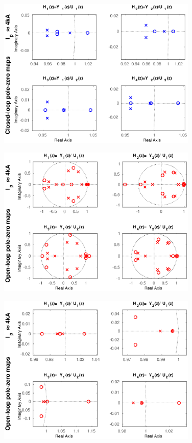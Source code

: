 \begin{figure}
	\centering
	\includegraphics[width=0.85\textwidth]{Chp5/PoleZero/PoleZeroClosePosZoom.eps}
	\label{PoleZeroClosePosZoom}
\end{figure}	


\begin{figure}
	\centering
	\includegraphics[width=0.85\textwidth]{Chp5/PoleZero/PoleZeroOpenPos.eps}
	\label{PoleZeroOpenPos}
\end{figure}	

\begin{figure}
	\centering
	\includegraphics[width=0.85\textwidth]{Chp5/PoleZero/PoleZeroOpenPosZoom.eps}
	\label{PoleZeroOpenPosZoom}
\end{figure}

